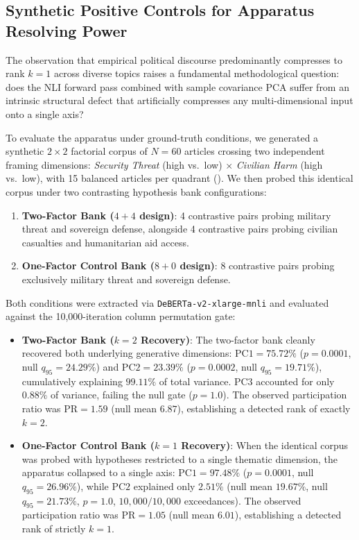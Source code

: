 \subsection{Synthetic Positive Controls for Apparatus Resolving Power}
\label{sec:synthetic_positive_control}

The observation that empirical political discourse predominantly compresses to rank $k=1$ across diverse topics raises a fundamental methodological question: does the NLI forward pass combined with sample covariance PCA suffer from an intrinsic structural defect that artificially compresses any multi-dimensional input onto a single axis?

To evaluate the apparatus under ground-truth conditions, we generated a synthetic $2 \times 2$ factorial corpus of $N=60$ articles crossing two independent framing dimensions: \emph{Security Threat} (high vs.\ low) $\times$ \emph{Civilian Harm} (high vs.\ low), with 15 balanced articles per quadrant (). We then probed this identical corpus under two contrasting hypothesis bank configurations:
\begin{enumerate}
    \item \textbf{Two-Factor Bank ($4+4$ design)}: 4 contrastive pairs probing military threat and sovereign defense, alongside 4 contrastive pairs probing civilian casualties and humanitarian aid access.
    \item \textbf{One-Factor Control Bank ($8+0$ design)}: 8 contrastive pairs probing exclusively military threat and sovereign defense.
\end{enumerate}

Both conditions were extracted via \texttt{DeBERTa-v2-xlarge-mnli} and evaluated against the 10,000-iteration column permutation gate:
\begin{itemize}
    \item \textbf{Two-Factor Bank ($k=2$ Recovery)}: The two-factor bank cleanly recovered both underlying generative dimensions: $\mathrm{PC1} = 75.72\%$ ($p = 0.0001$, null $q_{95} = 24.29\%$) and $\mathrm{PC2} = 23.39\%$ ($p = 0.0002$, null $q_{95} = 19.71\%$), cumulatively explaining $\mathbf{99.11\%}$ of total variance. $\mathrm{PC3}$ accounted for only $0.88\%$ of variance, failing the null gate ($p = 1.0$). The observed participation ratio was $\mathrm{PR} = 1.59$ (null mean $6.87$), establishing a detected rank of exactly $k = 2$.
    \item \textbf{One-Factor Control Bank ($k=1$ Recovery)}: When the identical corpus was probed with hypotheses restricted to a single thematic dimension, the apparatus collapsed to a single axis: $\mathrm{PC1} = 97.48\%$ ($p = 0.0001$, null $q_{95} = 26.96\%$), while $\mathrm{PC2}$ explained only $2.51\%$ (null mean $19.67\%$, null $q_{95} = 21.73\%$, $p = 1.0$, $10{,}000/10{,}000$ exceedances). The observed participation ratio was $\mathrm{PR} = 1.05$ (null mean $6.01$), establishing a detected rank of strictly $k = 1$.
\end{itemize}

